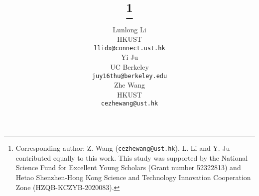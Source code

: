 \documentclass{article}%
\begin{document}
\title{\vspace{18 pt}{Quantifying the Impact of Load Forecast on Economic Building Energy Management}
\thanks{{Corresponding author: Z. Wang (\texttt{cezhewang@ust.hk}). L. Li and Y. Ju contributed equally to this work. This study was supported by the National Science Fund for Excellent Young Scholars (Grant number 52322813) and Hetao Shenzhen-Hong Kong Science and Technology Innovation Cooperation Zone (HZQB-KCZYB-2020083).}}
}





\author{
Lunlong Li\\
HKUST\\
\texttt{llidx@connect.ust.hk}\\
\And
Yi Ju\\
UC Berkeley\\
\texttt{juy16thu@berkeley.edu}\\
\And
Zhe Wang\\
HKUST\\
\texttt{cezhewang@ust.hk}\\
}
\end{document}
